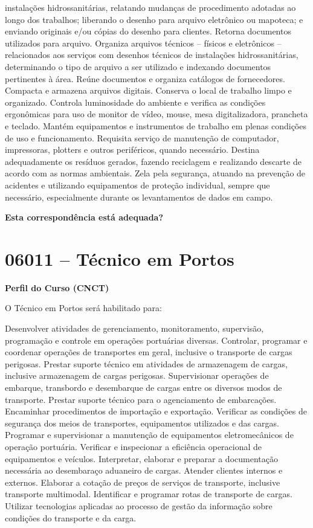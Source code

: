 \documentclass[
]{article}
\begin{document}
instalações hidrossanitárias, relatando mudanças de procedimento
adotadas ao longo dos trabalhos; liberando o desenho para arquivo
eletrônico ou mapoteca; e enviando originais e/ou cópias do desenho para
clientes. Retorna documentos utilizados para arquivo. Organiza arquivos
técnicos -- físicos e eletrônicos -- relacionados aos serviços com
desenhos técnicos de instalações hidrossanitárias, determinando o tipo
de arquivo a ser utilizado e indexando documentos pertinentes à área.
Reúne documentos e organiza catálogos de fornecedores. Compacta e
armazena arquivos digitais. Conserva o local de trabalho limpo e
organizado. Controla luminosidade do ambiente e verifica as condições
ergonômicas para uso de monitor de vídeo, mouse, mesa digitalizadora,
prancheta e teclado. Mantém equipamentos e instrumentos de trabalho em
plenas condições de uso e funcionamento. Requisita serviço de manutenção
de computador, impressoras, plotters e outros periféricos, quando
necessário. Destina adequadamente os resíduos gerados, fazendo
reciclagem e realizando descarte de acordo com as normas ambientais.
Zela pela segurança, atuando na prevenção de acidentes e utilizando
equipamentos de proteção individual, sempre que necessário,
especialmente durante os levantamentos de dados em campo.

\begin{Form}
\textbf{Esta correspondência está adequada?} \\ 
\end{Form}

\newpage
\section{ 06011 -- Técnico em Portos }

\textbf{Perfil do Curso (CNCT)}

O Técnico em Portos será habilitado para:

Desenvolver atividades de gerenciamento, monitoramento, supervisão,
programação e controle em operações portuárias diversas. Controlar,
programar e coordenar operações de transportes em geral, inclusive o
transporte de cargas perigosas. Prestar suporte técnico em atividades de
armazenagem de cargas, inclusive armazenagem de cargas perigosas.
Supervisionar operações de embarque, transbordo e desembarque de cargas
entre os diversos modos de transporte. Prestar suporte técnico para o
agenciamento de embarcações. Encaminhar procedimentos de importação e
exportação. Verificar as condições de segurança dos meios de
transportes, equipamentos utilizados e das cargas. Programar e
supervisionar a manutenção de equipamentos eletromecânicos de operação
portuária. Verificar e inspecionar a eficiência operacional de
equipamentos e veículos. Interpretar, elaborar e preparar a documentação
necessária ao desembaraço aduaneiro de cargas. Atender clientes internos
e externos. Elaborar a cotação de preços de serviços de transporte,
inclusive transporte multimodal. Identificar e programar rotas de
transporte de cargas. Utilizar tecnologias aplicadas ao processo de
gestão da informação sobre condições do transporte e da carga.
\end{document}
